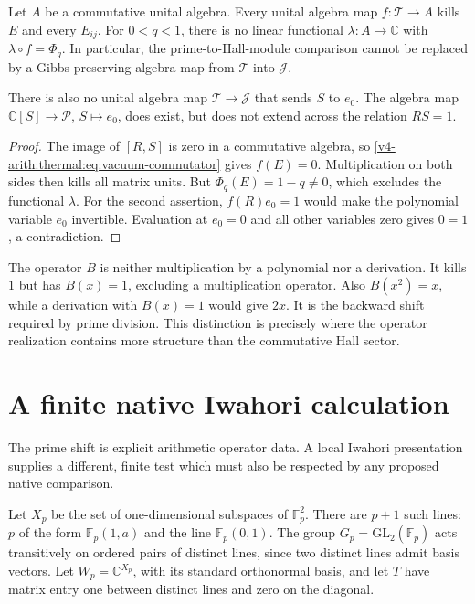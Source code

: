 \begin{theorem}
\label{v4-arith:thermal:thm:hall-algebra-obstruction}
Let $A$ be a commutative unital algebra. Every unital algebra map
$f:\mathcal T\to A$ kills $E$ and every $E_{ij}$. For $0<q<1$,
there is no linear functional $\lambda:A\to\mathbb C$ with
$\lambda\circ f=\Phi_q$. In particular, the prime-to-Hall-module
comparison cannot be replaced by a Gibbs-preserving algebra map
from $\mathcal T$ into $\mathcal J$.

There is also no unital algebra map $\mathcal T\to\mathcal J$
that sends $S$ to $e_0$. The algebra map
$\mathbb C[S]\to\mathcal P$, $S\mapsto e_0$, does exist, but
does not extend across the relation $RS=1$.
\end{theorem}

\begin{proof}
The image of $[R,S]$ is zero in a commutative algebra, so
\eqref{v4-arith:thermal:eq:vacuum-commutator} gives $f(E)=0$. Multiplication on
both sides then kills all matrix units. But
$\Phi_q(E)=1-q\ne0$, which excludes the functional $\lambda$.
For the second assertion, $f(R)e_0=1$ would make the polynomial
variable $e_0$ invertible. Evaluation at $e_0=0$ and all other
variables zero gives $0=1$, a contradiction.
\end{proof}

The operator $B$ is neither multiplication by a polynomial nor a
derivation. It kills $1$ but has $B(x)=1$, excluding a multiplication
operator. Also $B(x^2)=x$, while a derivation with $B(x)=1$ would
give $2x$. It is the backward shift required by prime division.
This distinction is precisely where the operator realization
contains more structure than the commutative Hall sector.

\section{A finite native Iwahori calculation}

The prime shift is explicit arithmetic operator data. A local
Iwahori presentation supplies a different, finite test which must
also be respected by any proposed native comparison.

Let $X_p$ be the set of one-dimensional subspaces of $\mathbb F_p^2$.
There are $p+1$ such lines: $p$ of the form $\mathbb F_p(1,a)$
and the line $\mathbb F_p(0,1)$. The group
$G_p=\mathrm{GL}_2(\mathbb F_p)$ acts transitively on ordered pairs
of distinct lines, since two distinct lines admit basis vectors.
Let $W_p=\mathbb C^{X_p}$, with its standard orthonormal basis,
and let $T$ have matrix entry one between distinct lines and
zero on the diagonal.

